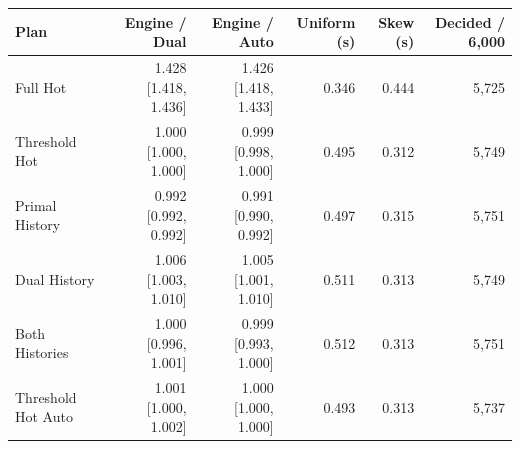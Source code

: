 \begingroup\fontsize{8}{9.4}\selectfont\setlength{\tabcolsep}{3pt}
\begin{tabular*}{\textwidth}{@{\extracolsep{\fill}}lrrrrr@{}}
\toprule
Plan & Engine / Dual & Engine / Auto & Uniform (s) & Skew (s) & Decided / 6,000\\
\midrule
Full Hot & 1.428 [1.418, 1.436] & 1.426 [1.418, 1.433] & 0.346 & 0.444 & 5,725\\
Threshold Hot & 1.000 [1.000, 1.000] & 0.999 [0.998, 1.000] & 0.495 & 0.312 & 5,749\\
Primal History & 0.992 [0.992, 0.992] & 0.991 [0.990, 0.992] & 0.497 & 0.315 & 5,751\\
Dual History & 1.006 [1.003, 1.010] & 1.005 [1.001, 1.010] & 0.511 & 0.313 & 5,749\\
Both Histories & 1.000 [0.996, 1.001] & 0.999 [0.993, 1.000] & 0.512 & 0.313 & 5,751\\
Threshold Hot Auto & 1.001 [1.000, 1.002] & 1.000 [1.000, 1.000] & 0.493 & 0.313 & 5,737\\
\bottomrule
\end{tabular*}
\endgroup
